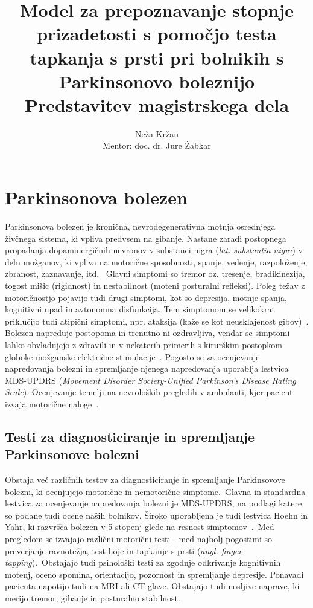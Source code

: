 \documentclass[a4paper,12pt]{article}
\title{Model za prepoznavanje stopnje prizadetosti s pomočjo testa tapkanja s prsti pri bolnikih s 
Parkinsonovo boleznijo \\ 
Predstavitev magistrskega dela}
\author{Neža Kržan \\
Mentor: doc. dr. Jure Žabkar}
\begin{document}
\maketitle

\section{Parkinsonova bolezen}

Parkinsonova bolezen je kronična, nevrodegenerativna motnja osrednjega živčnega sistema, ki vpliva 
predvsem na gibanje. Nastane zaradi postopnega propadanja dopaminergičnih nevronov v substanci 
nigra (\textit{lat. substantia nigra}) v delu možganov, ki vpliva na motorične sposobnosti, spanje, vedenje, 
razpoloženje, zbranost, zaznavanje, itd. \
Glavni simptomi so tremor oz. tresenje, bradikinezija, togost mišic (rigidnost) in nestabilnost (moteni posturalni refleksi). 
Poleg težav z motoričnostjo pojavijo tudi drugi simptomi, kot so depresija, 
motnje spanja, kognitivni upad in avtonomna disfunkcija. Tem simptomom se velikokrat priklučijo tudi 
atipični simptomi, npr. ataksija (kaže se kot neusklajenost gibov)~\cite{NINDS}. \\

Bolezen napreduje postopoma in trenutno ni ozdravljiva, vendar se simptomi lahko obvladujejo z zdravili 
in v nekaterih primerih s kirurškim postopkom globoke možganske električne stimulacije~\cite{Sveinbjornsdottir}. 
Pogosto se za ocenjevanje napredovanja bolezni in spremljanje njenega napredovanja uporablja lestvica 
MDS-UPDRS (\textit{Movement Disorder Society-Unified Parkinson's Disease Rating Scale}). Ocenjevanje temelji na 
nevroloških pregledih v ambulanti, kjer pacient izvaja motorične naloge~\cite{Goetz}. \\

\subsection{Testi za diagnosticiranje in spremljanje Parkinsonove bolezni}

Obstaja več različnih testov za diagnosticiranje in spremljanje Parkinsovove bolezni, ki ocenjujejo 
motorične in nemotorične simptome.\
Glavna in standardna lestvica za ocenjevanje napredovanja bolezni je MDS-UPDRS, na podlagi katere so 
podane tudi ocene naših bolnikov. Široko uporabljena je tudi lestvica Hoehn in Yahr, ki razvršča 
bolezen v 5 stopenj glede na resnost simptomov~\cite{Bhidayasiri, wiki}.\
Med pregledom se izvajajo različni motorični testi - med najbolj pogostimi so preverjanje ravnotežja, 
test hoje in tapkanje s prsti (\textit{angl. finger tapping}).\
Obstajajo tudi psihološki testi za zgodnje odkrivanje kognitivnih motenj, oceno spomina, orientacijo, 
pozornost in spremljanje depresije. Ponavadi pacienta napotijo tudi na MRI ali CT glave. Obstajajo 
tudi nosljive naprave, ki merijo tremor, gibanje in posturalno stabilnost.
\end{document}
